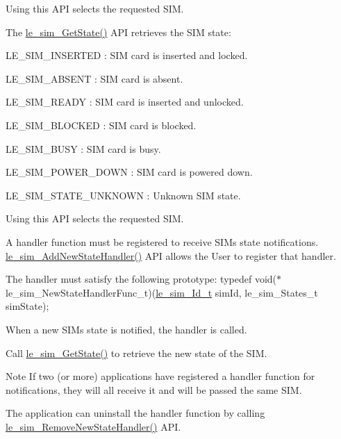 Using this A\+PI selects the requested S\+IM.

The \hyperlink{le__sim__interface_8h_a16b06f266471d81f772e5439ec570144}{le\+\_\+sim\+\_\+\+Get\+State()} A\+PI retrieves the S\+IM state\+:
\begin{DoxyItemize}
\item L\+E\+\_\+\+S\+I\+M\+\_\+\+I\+N\+S\+E\+R\+T\+ED \+: S\+IM card is inserted and locked.
\item L\+E\+\_\+\+S\+I\+M\+\_\+\+A\+B\+S\+E\+NT \+: S\+IM card is absent.
\item L\+E\+\_\+\+S\+I\+M\+\_\+\+R\+E\+A\+DY \+: S\+IM card is inserted and unlocked.
\item L\+E\+\_\+\+S\+I\+M\+\_\+\+B\+L\+O\+C\+K\+ED \+: S\+IM card is blocked.
\item L\+E\+\_\+\+S\+I\+M\+\_\+\+B\+U\+SY \+: S\+IM card is busy.
\item L\+E\+\_\+\+S\+I\+M\+\_\+\+P\+O\+W\+E\+R\+\_\+\+D\+O\+WN \+: S\+IM card is powered down.
\item L\+E\+\_\+\+S\+I\+M\+\_\+\+S\+T\+A\+T\+E\+\_\+\+U\+N\+K\+N\+O\+WN \+: Unknown S\+IM state.
\end{DoxyItemize}

Using this A\+PI selects the requested S\+IM.

A handler function must be registered to receive S\+IM\textquotesingle{}s state notifications. \hyperlink{le__sim__interface_8h_a8e296a7cd35edd99cb1dc21232e280dd}{le\+\_\+sim\+\_\+\+Add\+New\+State\+Handler()} A\+PI allows the User to register that handler.

The handler must satisfy the following prototype\+: typedef void($\ast$le\+\_\+sim\+\_\+\+New\+State\+Handler\+Func\+\_\+t)(\hyperlink{le__sim__interface_8h_aace49df88426119626fb1ef4e544ccdd}{le\+\_\+sim\+\_\+\+Id\+\_\+t} sim\+Id, {\ttfamily le\+\_\+sim\+\_\+\+States\+\_\+t} sim\+State);

When a new S\+IM\textquotesingle{}s state is notified, the handler is called.

Call \hyperlink{le__sim__interface_8h_a16b06f266471d81f772e5439ec570144}{le\+\_\+sim\+\_\+\+Get\+State()} to retrieve the new state of the S\+IM.

\begin{DoxyNote}{Note}
If two (or more) applications have registered a handler function for notifications, they will all receive it and will be passed the same S\+IM.
\end{DoxyNote}
The application can uninstall the handler function by calling \hyperlink{le__sim__interface_8h_a0286578e9aa46ba864df1878263b9f84}{le\+\_\+sim\+\_\+\+Remove\+New\+State\+Handler()} A\+PI.

